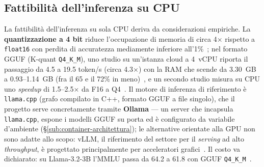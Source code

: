 \begin{table}
	\centering
	\caption{Criteri di selezione dello SLM e relative fonti.}
	\label{tab:slm-criteri}
	\small
\end{table}

\subsection{Fattibilità dell'inferenza su CPU}
\label{sub:slm-cpu}

La fattibilità dell'inferenza su sola CPU deriva da considerazioni empiriche. La \textbf{quantizzazione a 4 bit} riduce l'occupazione di memoria di circa 4$\times$ rispetto a \texttt{float16} con perdita di accuratezza mediamente inferiore all'1\%~\cite{malakhov2026cpullm}; nel formato GGUF (K-quant \texttt{Q4\_K\_M}), uno studio su un'istanza cloud a 4~vCPU riporta il passaggio da 4.5 a 19.5 token/s (circa 4.3$\times$) con la RAM che scende da 3.30~GB a 0.93--1.14~GB (fra il 65 e il 72\% in meno)~\cite{ecommerce2025slm}, e un secondo studio misura su CPU uno \textit{speedup} di 1.5--2.5$\times$ da F16 a Q4~\cite{cpudominance2025}. Il motore di inferenza di riferimento è \texttt{llama.cpp} (grafo compilato in C++, formato GGUF a file singolo), che il progetto serve concretamente tramite \textbf{Ollama} --- un server che incapsula \texttt{llama.cpp}, espone i modelli GGUF su porta ed è configurato da variabile d'ambiente (§\ref{sub:container-architettura}); le alternative orientate alla GPU non sono adatte allo scopo: vLLM, il riferimento del settore per il \textit{serving} ad alto \textit{throughput}, è progettato principalmente per acceleratori grafici~\cite{malakhov2026cpullm}. Il costo va dichiarato: su Llama-3.2-3B l'MMLU passa da 64.2 a 61.8 con GGUF \texttt{Q4\_K\_M}~\cite{mobilequant2025}.


